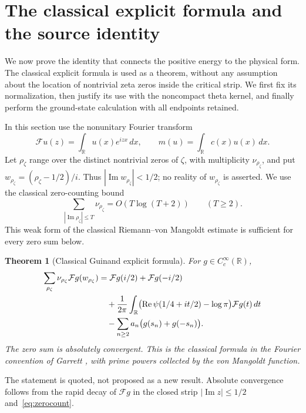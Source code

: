 \documentclass[11pt,a4paper]{article}
\numberwithin{equation}{section}
\newtheorem{theorem}{Theorem}[section]
\theoremstyle{definition}
\theoremstyle{remark}
\newcommand{\R}{\mathbb R}
\begin{document}
\section{The classical explicit formula and the source identity}\label{app:explicit}

We now prove the identity that connects the positive energy to the physical form. The classical explicit formula is used as a theorem, without any assumption about the location of nontrivial zeta zeros inside the critical strip. We first fix its normalization, then justify its use with the noncompact theta kernel, and finally perform the ground-state calculation with all endpoints retained.

In this section use the nonunitary Fourier transform
\[
 \mathcal Fu(z)=\int_\R u(x)e^{izx}\,dx,
 \qquad m(u)=\int_\R c(x)u(x)\,dx.
\]
Let $\rho_\zeta$ range over the distinct nontrivial zeros of $\zeta$, with multiplicity $\nu_{\rho_\zeta}$, and put $w_{\rho_\zeta}=(\rho_\zeta-1/2)/i$. Thus $|\operatorname{Im}w_{\rho_\zeta}|<1/2$; no reality of $w_{\rho_\zeta}$ is asserted. We use the classical zero-counting bound
\begin{equation}\label{eq:zerocount}
 \sum_{|\operatorname{Im}\rho_\zeta|\le T}\nu_{\rho_\zeta}
       =O(T\log(T+2))\qquad(T\ge2).
\end{equation}
This weak form of the classical Riemann--von Mangoldt estimate \cite[Theorem~0.1]{GarrettZeros} is sufficient for every zero sum below.

\begin{theorem}[Classical Guinand explicit formula]\label{thm:guinand}
For $g\in C_c^\infty(\R)$,
\begin{align}\label{eq:guinand}
 \sum_{\rho_\zeta}\nu_{\rho_\zeta}\mathcal Fg(w_{\rho_\zeta})
 &=\mathcal Fg(i/2)+\mathcal Fg(-i/2)\notag\\
 &\quad+\frac1{2\pi}\int_\R
   \bigl(\operatorname{Re}\psi(1/4+it/2)-\log\pi\bigr)
       \mathcal Fg(t)\,dt\notag\\
 &\quad-\sum_{n\ge2}a_n\bigl(g(s_n)+g(-s_n)\bigr).
\end{align}
The zero sum is absolutely convergent. This is the classical formula in the Fourier convention of Garrett \cite[Theorem~0.1]{Garrett}, with prime powers collected by the von Mangoldt function.
\end{theorem}

The statement is quoted, not proposed as a new result. Absolute convergence follows from the rapid decay of $\mathcal Fg$ in the closed strip $|\operatorname{Im}z|\le1/2$ and~\eqref{eq:zerocount}.
\end{document}
